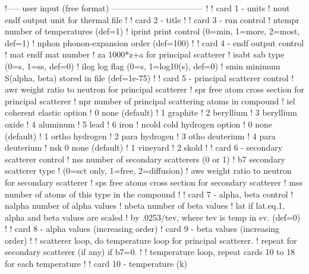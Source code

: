 \small
\begin{ccode}

   !----- user input (free format) ---------------------------------
   !
   ! card 1 - units
   !    nout     endf output unit for thermal file
   !
   ! card 2 - title
   !
   ! card 3 - run control
   !    ntempr  number of temperatures (def=1)
   !    iprint  print control (0=min, 1=more, 2=most, def=1)
   !    nphon   phonon-expansion order (def=100)
   !
   ! card 4 - endf output control
   !    mat     endf mat number
   !    za      1000*z+a for principal scatterer
   !    isabt   sab type (0=s, 1=ss, def=0)
   !    ilog    log flag (0=s, 1=log10(s), def=0)
   !    smin    minimum S(alpha, beta) stored in file (def=1e-75)
   !
   ! card 5 - principal scatterer control
   !    awr     weight ratio to neutron for principal scatterer
   !    spr     free atom cross section for principal scatterer
   !    npr     number of principal scattering atoms in compound
   !    iel     coherent elastic option
   !                   0  none (default)
   !                   1  graphite
   !                   2  beryllium
   !                   3  beryllium oxide
   !                   4  aluminum
   !                   5  lead
   !                   6  iron
   !    ncold   cold hydrogen option
   !                   0   none (default)
   !                   1   ortho hydrogen
   !                   2   para hydrogen
   !                   3   otho deuterium
   !                   4   para deuterium
   !    nsk            0   none (default)
   !                   1   vineyard
   !                   2   skold
   !
   ! card 6 - secondary scatterer control
   !    nss     number of secondary scatterers (0 or 1)
   !    b7      secondary scatterer type
   !             (0=sct only, 1=free, 2=diffusion)
   !    aws     weight ratio to neutron for secondary scatterer
   !    sps     free atoms cross section for secondary scatterer
   !    mss     number of atoms of this type in the compound
   !
   ! card 7 - alpha, beta control
   !    nalpha   number of alpha values
   !    nbeta    number of beta values
   !    lat      if lat.eq.1, alpha and beta values are scaled
   !               by .0253/tev, where tev is temp in ev.  (def=0)
   !
   ! card 8 - alpha values (increasing order)
   ! card 9 - beta values (increasing order)
   !
   ! scatterer loop, do temperature loop for principal scatterer.
   !         repeat for secondary scatterer (if any) if b7=0.
   !
   ! temperature loop, repeat cards 10 to 18 for each temperature
   !
   !    card 10 - temperature (k)

\end{ccode}
